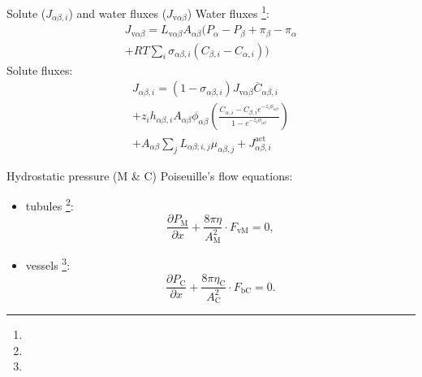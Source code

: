 \documentclass{beamer}
\begin{document}
\begin{frame}{Solute ($J_{\alpha\beta,i}$) and water fluxes ($J_{\mathrm{v}\alpha\beta}$)}
    Water fluxes \citep{Weinstein1983}\footnote[frame,1]{\tiny{}}:
    \begin{multline}
        J_{\mathrm{v}\alpha\beta} = 
            L_{\mathrm{v}\alpha\beta}A_{\alpha\beta}\bigg(P_\alpha-P_\beta+\pi_\beta-\pi_\alpha\\
            +RT\sum_i\sigma_{\alpha\beta,i}\left(C_{\beta,i}-C_{\alpha,i}\right)\bigg)
    \end{multline}
    Solute fluxes:
    \begin{multline}
        J_{\alpha\beta,i} = (1-\sigma_{\alpha\beta,i})J_{\mathrm{v}\alpha\beta}\overline{C}_{\alpha\beta,i}\\
        +z_ih_{\alpha\beta,i}A_{\alpha\beta}\phi_{\alpha\beta}\left(\frac{C_{\alpha,i}-C_{\beta,i}e^{-z_i\phi_{\alpha\beta}}}{1-e^{-z_i\phi_{\alpha\beta}}}\right)\\
        +A_{\alpha\beta}\sum_j L_{\alpha\beta;i,j}\mu_{\alpha\beta,j} + J^{\mathrm{act}}_{\alpha\beta,i}
    \end{multline}

\end{frame}
        
\begin{frame}{Hydrostatic pressure (M \& C)}
    Poiseuille's flow equations:
    \begin{itemize}
        \item tubules \citep{Weinstein1998}\footnote[frame,1]{\tiny{}}:
        \begin{equation}
            \frac{\partial P_\mathrm{M}}{\partial x}+\frac{8\pi\eta}{A^2_\mathrm{M}}\cdot F_\mathrm{vM}=0,
        \end{equation}
        \item vessels \citep{Weinstein2017}\footnote[frame,2]{\tiny{}}:
        \begin{equation}
            \frac{\partial P_\mathrm{C}}{\partial x}+\frac{8\pi\eta_\mathrm{C}}{A^2_\mathrm{C}}\cdot F_\mathrm{bC}=0.
        \end{equation}
    \end{itemize}
\end{frame}
\end{document}

